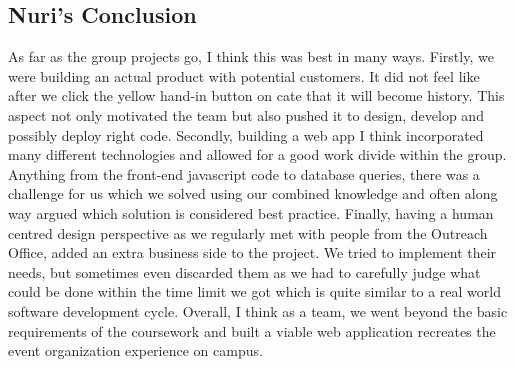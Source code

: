 \documentclass[10pt,a4paper]{article}
\begin{document}
\subsection{Nuri's Conclusion}
As far as the group projects go, I think this was best in many ways. Firstly, we were building an actual product with potential customers. It did not feel like after we click the yellow hand-in button on cate that it will become history. This aspect not only motivated the team but also pushed it to design, develop and possibly deploy right code. Secondly, building a web app I think incorporated many different technologies and allowed for a good work divide within the group. Anything from the front-end javascript code to database queries, there was a challenge for us which we solved using our combined knowledge and often along way argued which solution is considered best practice. Finally, having a human centred design perspective as we regularly met with people from the Outreach Office, added an extra business side to the project. We tried to implement their needs, but sometimes even discarded them as we had to carefully judge what could be done within the time limit we got which is quite similar to a real world software development cycle. Overall, I think as a team, we went beyond the basic requirements of the coursework and built a viable web application recreates the event organization experience on campus.

\appendix
\label{appendix}
\end{document}
